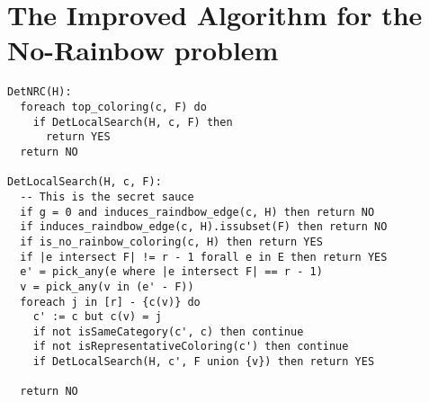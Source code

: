 \documentclass{book}
\begin{document}
\chapter{The Improved Algorithm for the No-Rainbow problem}

\begin{verbatim}
DetNRC(H):
  foreach top_coloring(c, F) do
    if DetLocalSearch(H, c, F) then
      return YES
  return NO

DetLocalSearch(H, c, F):
  -- This is the secret sauce
  if g = 0 and induces_raindbow_edge(c, H) then return NO
  if induces_raindbow_edge(c, H).issubset(F) then return NO
  if is_no_rainbow_coloring(c, H) then return YES
  if |e intersect F| != r - 1 forall e in E then return YES
  e' = pick_any(e where |e intersect F| == r - 1)
  v = pick_any(v in (e' - F))
  foreach j in [r] - {c(v)} do
    c' := c but c(v) = j
    if not isSameCategory(c', c) then continue
    if not isRepresentativeColoring(c') then continue
    if DetLocalSearch(H, c', F union {v}) then return YES

  return NO
\end{verbatim}
\end{document}
